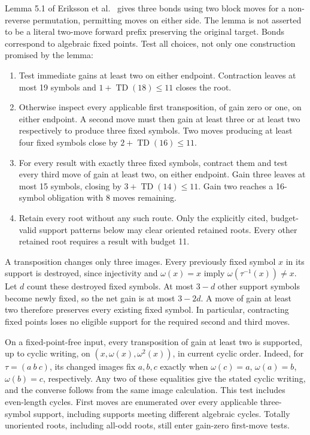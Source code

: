 \documentclass[11pt,a4paper]{article}
\newcommand{\TD}{\operatorname{TD}}
\begin{document}
Lemma 5.1 of Eriksson et al.~\cite{eriksson} gives three bonds using two block
moves for a non-reverse permutation, permitting moves on either side. The
lemma is not asserted to be a literal two-move forward prefix preserving the
original target. Bonds correspond to algebraic fixed points. Test all choices,
not only one construction promised by the lemma:
\begin{enumerate}
\item Test immediate gains at least two on either endpoint. Contraction leaves
at most 19 symbols and $1+\TD(18)\leq 11$ closes the root.
\item Otherwise inspect every applicable first transposition, of gain zero or
one, on either endpoint. A second move must then gain at least three or at least
two respectively to produce three fixed symbols. Two moves producing at least
four fixed symbols close by $2+\TD(16)\leq 11$.
\item For every result with exactly three fixed symbols, contract them and test
every third move of gain at least two, on either endpoint. Gain three leaves at
most 15 symbols, closing by $3+\TD(14)\leq 11$. Gain two
reaches a 16-symbol obligation with 8 moves remaining.
\item Retain every root without any such route. Only the explicitly cited,
budget-valid support patterns below may clear oriented retained roots. Every
other retained root requires a result with budget 11.
\end{enumerate}

A transposition changes only three images. Every previously fixed symbol $x$
in its support is destroyed, since injectivity and $\omega(x)=x$ imply
$\omega(\tau^{-1}(x))\ne x$. Let $d$ count these destroyed fixed symbols.
At most $3-d$ other support symbols become newly fixed, so the net gain is
at most $3-2d$. A move of gain at least two therefore preserves every existing
fixed symbol. In particular, contracting fixed points loses no eligible
support for the required second and third moves.

On a fixed-point-free input, every transposition of gain at least two is
supported, up to cyclic writing, on $(x,\omega(x),\omega^2(x))$, in current
cyclic order. Indeed, for $\tau=(a\ b\ c)$, its changed images fix $a,b,c$
exactly when $\omega(c)=a$, $\omega(a)=b$, $\omega(b)=c$, respectively.
Any two of these equalities give the stated cyclic writing, and the converse
follows from the same image calculation. This test includes even-length cycles.
First moves are enumerated over every applicable three-symbol support,
including supports meeting different algebraic cycles. Totally unoriented
roots, including all-odd roots, still enter gain-zero first-move tests.
\end{document}
